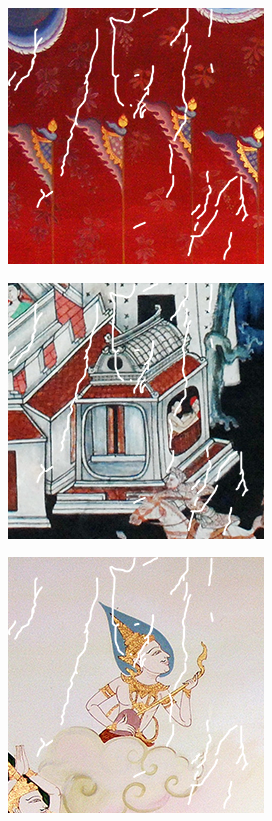 \documentclass[xcolor=dvipsnames, xetex,serif]{beamer}
\numberwithin{equation}{section}
\begin{document}
\begin{frame}
\begin{figure}[H]
\begin{subfigure}{0.3\linewidth}
					\includegraphics[width=0.7\linewidth]{images/thaiart/case03-toinpaint.png}			
				\end{subfigure}
				\begin{subfigure}{0.3\linewidth}
					\centering
					\includegraphics[width=0.7\linewidth]{images/thaiart/case04-toinpaint.png}			
				\end{subfigure}
				\begin{subfigure}{0.3\linewidth}
					\centering
					\includegraphics[width=0.7\linewidth]{images/thaiart/case05-toinpaint.png}			

\end{subfigure}
\end{figure}
\end{frame}
\end{document}
